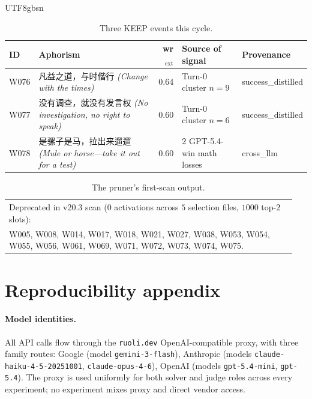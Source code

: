 \documentclass{article}
\begin{document}
\begin{CJK*}{UTF8}{gbsn}
\begin{table}[h]
  \centering\small
  \begin{tabular}{l l r l l}
    \toprule
    ID & Aphorism & wr\(_{\text{ext}}\) & Source of signal & Provenance \\
    \midrule
    W076 & 凡益之道，与时偕行 \emph{(Change with the times)} & 0.64
      & Turn-0 cluster \(n=9\) & success\_distilled \\
    W077 & 没有调查，就没有发言权 \emph{(No investigation, no right to speak)} & 0.60
      & Turn-0 cluster \(n=6\) & success\_distilled \\
    W078 & 是骡子是马，拉出来遛遛 \emph{(Mule or horse---take it out for a test)} & 0.60
      & 2 GPT-5.4-win math losses & cross\_llm \\
    \bottomrule
  \end{tabular}
  \caption{Three KEEP events this cycle.}
  \label{tab:kepts}
\end{table}

\begin{table}[h]
  \centering\small
  \begin{tabular}{p{0.95\linewidth}}
    \toprule
    Deprecated in v20.3 scan (\(0\) activations across \(5\) selection
    files, \(1000\) top-2 slots): \\
    W005, W008, W014, W017, W018, W021, W027, W038, W053, W054, W055,
    W056, W061, W069, W071, W072, W073, W074, W075. \\
    \bottomrule
  \end{tabular}
  \caption{The pruner's first-scan output.}
  \label{tab:deprecated}
\end{table}

\section{Reproducibility appendix}
\label{app:repro}

\paragraph{Model identities.} All API calls flow through the
\texttt{ruoli.dev} OpenAI-compatible proxy, with three family routes:
Google (model \texttt{gemini-3-flash}), Anthropic (models
\texttt{claude-haiku-4-5-20251001}, \texttt{claude-opus-4-6}), OpenAI
(models \texttt{gpt-5.4-mini}, \texttt{gpt-5.4}). The proxy is used
uniformly for both solver and judge roles across every experiment;
no experiment mixes proxy and direct vendor access.


\end{CJK*}
\end{document}
